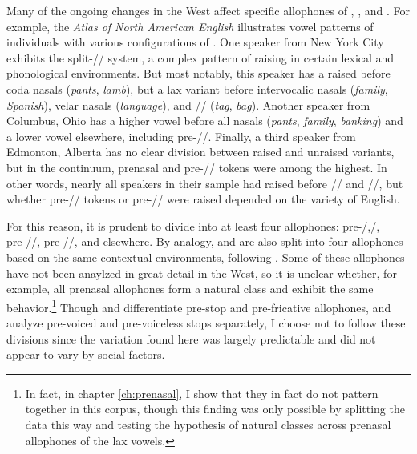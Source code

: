 Many of the ongoing changes in the West affect specific allophones of \trap, \dress, and \kit. For example, the \textit{Atlas of North American English} \citep[169--184]{labov_ash_boberg_2006_anae} illustrates vowel patterns of individuals with various configurations of \trap. One speaker from New York City exhibits the split-/\textipa{\ae}/ system, a complex pattern of raising in certain lexical and phonological environments. But most notably, this speaker has a raised \trap before coda nasals (\textit{pants}, \textit{lamb}), but a lax variant before intervocalic nasals (\textit{family}, \textit{Spanish}), velar nasals (\textit{language}), and // (\textit{tag}, \textit{bag}). Another speaker from Columbus, Ohio has a higher vowel before all nasals (\textit{pants}, \textit{family}, \textit{banking}) and a lower vowel elsewhere, including pre-//. Finally, a third speaker from Edmonton, Alberta has no clear division between raised and unraised variants, but in the continuum, prenasal and pre-// tokens were among the highest. In other words, nearly all speakers in their sample had raised \trap before // and //, but whether pre-// tokens or pre-// were raised depended on the variety of English.

For this reason, it is prudent to divide \trap into at least four allophones: pre-/,/, pre-//, pre-//, and elsewhere. By analogy, \dress and \kit are also split into four allophones based on the same contextual environments, following \citet{cardoso_etal_2016_pads}. Some of these allophones have not been anaylzed in great detail in the West, so it is unclear whether, for example, all prenasal allophones form a natural class and exhibit the same behavior.\footnote{In fact, in chapter \ref{ch:prenasal}, I show that they in fact do not pattern together in this corpus, though this finding was only possible by splitting the data this way and testing the hypothesis of natural classes across prenasal allophones of the lax vowels.} Though \citet{moonwomon_1991_diss} and \citet{swan_2016_proceedings} differentiate pre-stop and pre-fricative allophones, and \citep{labov_ash_boberg_2006_anae} analyze pre-voiced and pre-voiceless stops separately, I choose not to follow these divisions since the variation found here was largely predictable and did not appear to vary by social factors.



